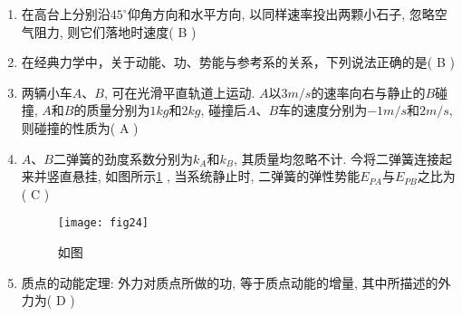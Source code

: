 \begin{enumerate}
\begin{note}
    \end{note}
    \item 在高台上分别沿$45^\circ$仰角方向和水平方向, 以同样速率投出两颗小石子, 忽略空气阻力, 则它们落地时速度( B )
    \item 在经典力学中，关于动能、功、势能与参考系的关系，下列说法正确的是( B )
    \item 两辆小车$A$、$B$, 可在光滑平直轨道上运动. $A$以$3 m/s$的速率向右与静止的$B$碰撞, $A$和$B$的质量分别为$1kg$和$2kg$, 碰撞后$A$、$B$车的速度分别为$-1 m/s$和$2 m/s$, 则碰撞的性质为( A )    
    \item $A$、$B$二弹簧的劲度系数分别为$k_A$和$k_B$, 其质量均忽略不计. 今将二弹簧连接起来并竖直悬挂, 如图所示\ref{Fig:24} , 当系统静止时, 二弹簧的弹性势能$E_{PA}$与$E_{PB}$之比为( C )                                                 
    \begin{figure}[H]
        \centering
        \texttt{[image: fig24]}
            \caption{如图}\label{Fig:24}
    \end{figure}

    \item 质点的动能定理: 外力对质点所做的功, 等于质点动能的增量, 其中所描述的外力为( D )                                           
   
\end{enumerate}
